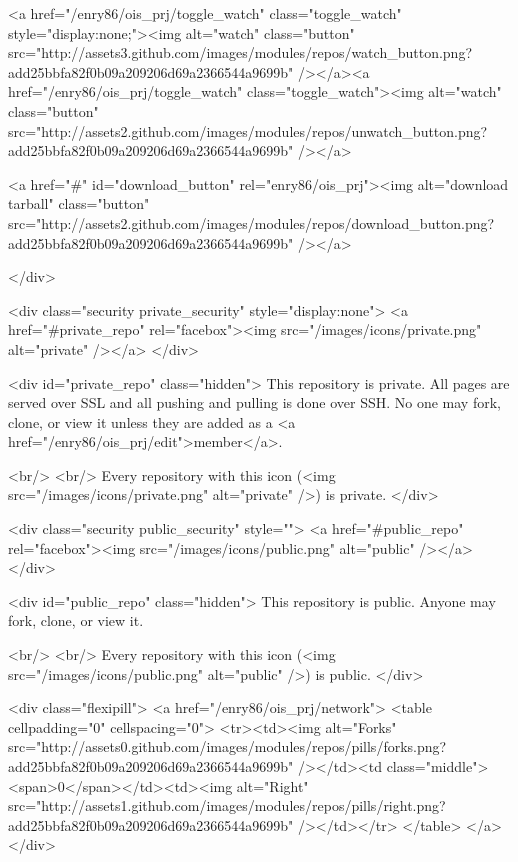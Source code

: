           <a href="/enry86/ois_prj/toggle_watch" class="toggle_watch" style="display:none;"><img alt="watch" class="button" src="http://assets3.github.com/images/modules/repos/watch_button.png?add25bbfa82f0b09a209206d69a2366544a9699b" /></a><a href="/enry86/ois_prj/toggle_watch" class="toggle_watch"><img alt="watch" class="button" src="http://assets2.github.com/images/modules/repos/unwatch_button.png?add25bbfa82f0b09a209206d69a2366544a9699b" /></a>

          
            <a href="#" id="download_button" rel="enry86/ois_prj"><img alt="download tarball" class="button" src="http://assets2.github.com/images/modules/repos/download_button.png?add25bbfa82f0b09a209206d69a2366544a9699b" /></a>
          
        
      </div>

      <div class="security private_security" style="display:none">
        <a href="#private_repo" rel="facebox"><img src="/images/icons/private.png" alt="private" /></a>
      </div>

      <div id="private_repo" class="hidden">
        This repository is private.
        All pages are served over SSL and all pushing and pulling is done over SSH.
        No one may fork, clone, or view it unless they are added as a <a href="/enry86/ois_prj/edit">member</a>.

        <br/>
        <br/>
        Every repository with this icon (<img src="/images/icons/private.png" alt="private" />) is private.
      </div>

      <div class="security public_security" style="">
        <a href="#public_repo" rel="facebox"><img src="/images/icons/public.png" alt="public" /></a>
      </div>

      <div id="public_repo" class="hidden">
        This repository is public.
        Anyone may fork, clone, or view it.

        <br/>
        <br/>
        Every repository with this icon (<img src="/images/icons/public.png" alt="public" />) is public.
      </div>

      

        <div class="flexipill">
          <a href="/enry86/ois_prj/network">
          <table cellpadding="0" cellspacing="0">
            <tr><td><img alt="Forks" src="http://assets0.github.com/images/modules/repos/pills/forks.png?add25bbfa82f0b09a209206d69a2366544a9699b" /></td><td class="middle"><span>0</span></td><td><img alt="Right" src="http://assets1.github.com/images/modules/repos/pills/right.png?add25bbfa82f0b09a209206d69a2366544a9699b" /></td></tr>
          </table>
          </a>
        </div>

